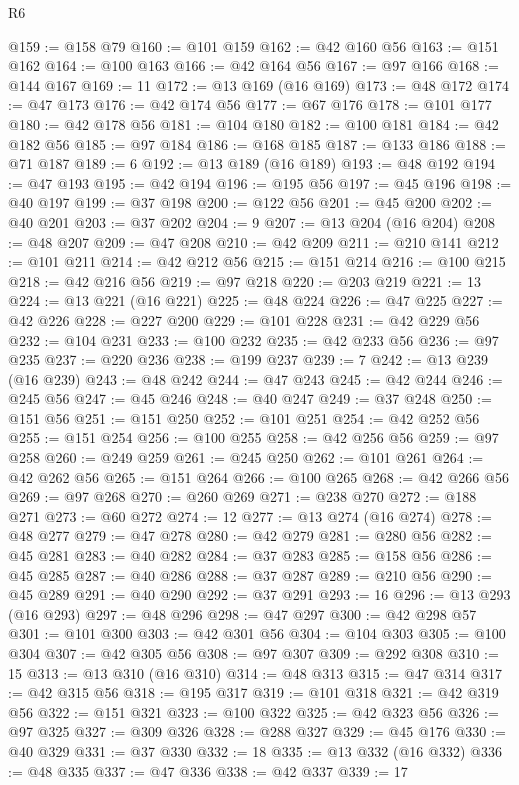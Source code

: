 \begin{lexlean}{R6}
\begin{coremodule}
@159 := @158 @79
@160 := @101 @159
@162 := @42 @160 @56
@163 := @151 @162
@164 := @100 @163
@166 := @42 @164 @56
@167 := @97 @166
@168 := @144 @167
@169 := 11
@172 := @13 @169 (@16 @169)
@173 := @48 @172
@174 := @47 @173
@176 := @42 @174 @56
@177 := @67 @176
@178 := @101 @177
@180 := @42 @178 @56
@181 := @104 @180
@182 := @100 @181
@184 := @42 @182 @56
@185 := @97 @184
@186 := @168 @185
@187 := @133 @186
@188 := @71 @187
@189 := 6
@192 := @13 @189 (@16 @189)
@193 := @48 @192
@194 := @47 @193
@195 := @42 @194
@196 := @195 @56
@197 := @45 @196
@198 := @40 @197
@199 := @37 @198
@200 := @122 @56
@201 := @45 @200
@202 := @40 @201
@203 := @37 @202
@204 := 9
@207 := @13 @204 (@16 @204)
@208 := @48 @207
@209 := @47 @208
@210 := @42 @209
@211 := @210 @141
@212 := @101 @211
@214 := @42 @212 @56
@215 := @151 @214
@216 := @100 @215
@218 := @42 @216 @56
@219 := @97 @218
@220 := @203 @219
@221 := 13
@224 := @13 @221 (@16 @221)
@225 := @48 @224
@226 := @47 @225
@227 := @42 @226
@228 := @227 @200
@229 := @101 @228
@231 := @42 @229 @56
@232 := @104 @231
@233 := @100 @232
@235 := @42 @233 @56
@236 := @97 @235
@237 := @220 @236
@238 := @199 @237
@239 := 7
@242 := @13 @239 (@16 @239)
@243 := @48 @242
@244 := @47 @243
@245 := @42 @244
@246 := @245 @56
@247 := @45 @246
@248 := @40 @247
@249 := @37 @248
@250 := @151 @56
@251 := @151 @250
@252 := @101 @251
@254 := @42 @252 @56
@255 := @151 @254
@256 := @100 @255
@258 := @42 @256 @56
@259 := @97 @258
@260 := @249 @259
@261 := @245 @250
@262 := @101 @261
@264 := @42 @262 @56
@265 := @151 @264
@266 := @100 @265
@268 := @42 @266 @56
@269 := @97 @268
@270 := @260 @269
@271 := @238 @270
@272 := @188 @271
@273 := @60 @272
@274 := 12
@277 := @13 @274 (@16 @274)
@278 := @48 @277
@279 := @47 @278
@280 := @42 @279
@281 := @280 @56
@282 := @45 @281
@283 := @40 @282
@284 := @37 @283
@285 := @158 @56
@286 := @45 @285
@287 := @40 @286
@288 := @37 @287
@289 := @210 @56
@290 := @45 @289
@291 := @40 @290
@292 := @37 @291
@293 := 16
@296 := @13 @293 (@16 @293)
@297 := @48 @296
@298 := @47 @297
@300 := @42 @298 @57
@301 := @101 @300
@303 := @42 @301 @56
@304 := @104 @303
@305 := @100 @304
@307 := @42 @305 @56
@308 := @97 @307
@309 := @292 @308
@310 := 15
@313 := @13 @310 (@16 @310)
@314 := @48 @313
@315 := @47 @314
@317 := @42 @315 @56
@318 := @195 @317
@319 := @101 @318
@321 := @42 @319 @56
@322 := @151 @321
@323 := @100 @322
@325 := @42 @323 @56
@326 := @97 @325
@327 := @309 @326
@328 := @288 @327
@329 := @45 @176
@330 := @40 @329
@331 := @37 @330
@332 := 18
@335 := @13 @332 (@16 @332)
@336 := @48 @335
@337 := @47 @336
@338 := @42 @337
@339 := 17

\end{coremodule}
\end{lexlean}
